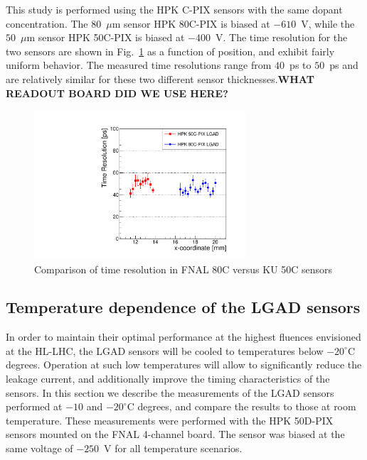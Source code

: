 \documentclass[preprint,1p]{elsarticle}
\begin{document}
This study is performed using the HPK C-PIX sensors with the same dopant concentration.
The $80$~$\mu$m sensor HPK 80C-PIX is biased at $-610$~V, while the $50$~$\mu$m sensor 
HPK 50C-PIX is biased at $-400$~V. The time resolution for the two sensors are shown
in Fig.~\ref{fig:HPK50CVs80C} as a function of position, and exhibit fairly uniform 
behavior. The measured time resolutions range from $40$~ps to $50$~ps and 
are relatively similar for these two different sensor
thicknesses.\textbf{WHAT READOUT BOARD DID WE USE HERE?}


\begin{figure}[htbp] 
\centering
\includegraphics[width=0.7\textwidth]{figs/FNAL_TimeResolution_vs_X_HPK50CVs80C.pdf} 
\caption{Comparison of time resolution in FNAL 80C versus KU 50C sensors } 
\label{fig:HPK50CVs80C} 
\end{figure} 


\subsection{Temperature dependence of the LGAD sensors}
\label{sec:temp_dependance}

In order to maintain their optimal performance at the highest fluences
envisioned at the HL-LHC, the LGAD sensors will be cooled to temperatures below
$-20^{\circ}$C degrees. Operation at such low temperatures will allow to
significantly reduce the leakage current, and additionally improve the timing
characteristics of the sensors. In this section we describe the measurements of
the LGAD sensors performed at $-10$ and $-20^{\circ}$C degrees, and compare the
results to those at room temperature. These measurements were performed with
the HPK 50D-PIX sensors mounted on the FNAL 4-channel board. The sensor was
biased at the same voltage of $-250$~V for all temperature scenarios.
\end{document}
